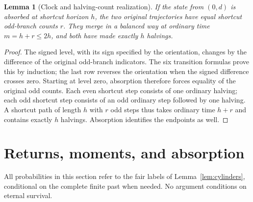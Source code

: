 \documentclass[11pt]{amsart}
\newtheorem{lemma}[theorem]{Lemma}
\theoremstyle{definition}
\theoremstyle{remark}
\begin{document}
\begin{lemma}[Clock and halving-count realization]\label{lem:clock}
If the state from $(0,d)$ is absorbed at shortcut horizon $h$, the two original trajectories have equal shortcut odd-branch counts $r$. They merge in a balanced way at ordinary time $m=h+r\le2h$, and both have made exactly $h$ halvings.
\end{lemma}
\begin{proof}
The signed level, with its sign specified by the orientation, changes by the difference of the original odd-branch indicators. The six transition formulas prove this by induction; the last row reverses the orientation when the signed difference crosses zero. Starting at level zero, absorption therefore forces equality of the original odd counts. Each even shortcut step consists of one ordinary halving; each odd shortcut step consists of an odd ordinary step followed by one halving. A shortcut path of length $h$ with $r$ odd steps thus takes ordinary time $h+r$ and contains exactly $h$ halvings. Absorption identifies the endpoints as well.
\end{proof}

\section{Returns, moments, and absorption}\label{sec:returns}
All probabilities in this section refer to the fair labels of Lemma~\ref{lem:cylinders}, conditional on the complete finite past when needed. No argument conditions on eternal survival.
\end{document}
